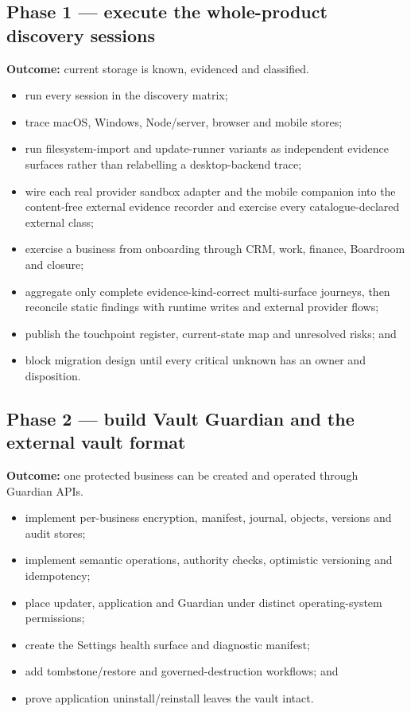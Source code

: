 \documentclass[11pt]{article}
\begin{document}
\subsection{Phase 1 --- execute the whole-product discovery sessions}

\textbf{Outcome:} current storage is known, evidenced and classified.

\begin{itemize}
  \item run every session in the discovery matrix;
  \item trace macOS, Windows, Node/server, browser and mobile stores;
  \item run filesystem-import and update-runner variants as independent evidence surfaces rather than relabelling a desktop-backend trace;
  \item wire each real provider sandbox adapter and the mobile companion into the content-free external evidence recorder and exercise every catalogue-declared external class;
  \item exercise a business from onboarding through CRM, work, finance, Boardroom and closure;
  \item aggregate only complete evidence-kind-correct multi-surface journeys, then reconcile static findings with runtime writes and external provider flows;
  \item publish the touchpoint register, current-state map and unresolved risks; and
  \item block migration design until every critical unknown has an owner and disposition.
\end{itemize}

\subsection{Phase 2 --- build Vault Guardian and the external vault format}

\textbf{Outcome:} one protected business can be created and operated through Guardian APIs.

\begin{itemize}
  \item implement per-business encryption, manifest, journal, objects, versions and audit stores;
  \item implement semantic operations, authority checks, optimistic versioning and idempotency;
  \item place updater, application and Guardian under distinct operating-system permissions;
  \item create the Settings health surface and diagnostic manifest;
  \item add tombstone/restore and governed-destruction workflows; and
  \item prove application uninstall/reinstall leaves the vault intact.
\end{itemize}
\end{document}
